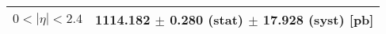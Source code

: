 \begin{tabular}{lc}
\hline
$0 < |\eta| <2.4$              & 1114.182 $\pm$ 0.280 (stat) $\pm$ 17.928 (syst) [pb]  \\
\hline
\end{tabular}
